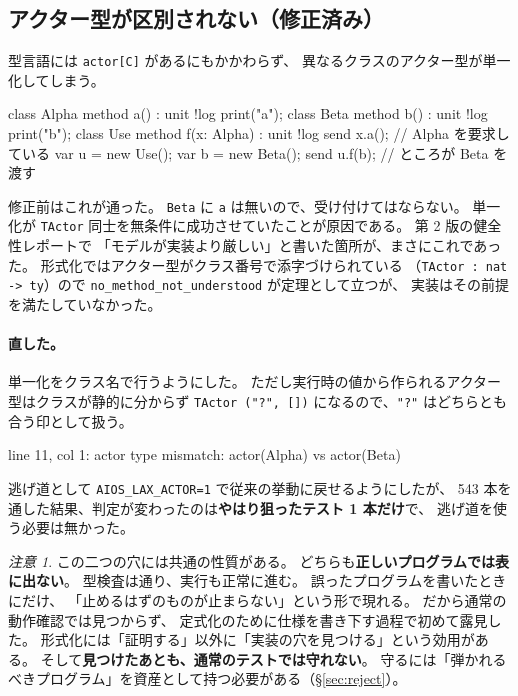 \documentclass[11pt,a4paper]{ltjsarticle}
\theoremstyle{definition}
\theoremstyle{remark}
\newtheorem{remark}[theorem]{注意}
\begin{document}
\subsection{アクター型が区別されない（修正済み）}

型言語には \texttt{actor[C]} があるにもかかわらず、
異なるクラスのアクター型が単一化してしまう。

\begin{aipl}
class Alpha { method a() : unit !{log} { print("a"); } }
class Beta  { method b() : unit !{log} { print("b"); } }
class Use {
  method f(x: Alpha) : unit !{log} { send x.a(); }   // Alpha を要求している
}
var u = new Use();
var b = new Beta();
send u.f(b);          // ところが Beta を渡す
\end{aipl}

修正前はこれが通った。
\texttt{Beta} に \texttt{a} は無いので、受け付けてはならない。
単一化が \texttt{TActor} 同士を無条件に成功させていたことが原因である。
第 2 版の健全性レポートで
「モデルが実装より厳しい」と書いた箇所が、まさにこれであった。
形式化ではアクター型がクラス番号で添字づけられている
（\texttt{TActor : nat -> ty}）ので
\texttt{no\_method\_not\_understood} が定理として立つが、
実装はその前提を満たしていなかった。

\paragraph{直した。}
単一化をクラス名で行うようにした。
ただし実行時の値から作られるアクター型はクラスが静的に分からず
\texttt{TActor ("?", [])} になるので、\texttt{"?"} はどちらとも合う印として扱う。

\begin{term}
 line 11, col 1: actor type mismatch: actor(Alpha) vs actor(Beta)
\end{term}

逃げ道として \texttt{AIOS\_LAX\_ACTOR=1} で従来の挙動に戻せるようにしたが、
543 本を通した結果、判定が変わったのは\textbf{やはり狙ったテスト 1 本だけ}で、
逃げ道を使う必要は無かった。

\begin{remark}
この二つの穴には共通の性質がある。
どちらも\textbf{正しいプログラムでは表に出ない}。
型検査は通り、実行も正常に進む。
誤ったプログラムを書いたときにだけ、
「止めるはずのものが止まらない」という形で現れる。
だから通常の動作確認では見つからず、
定式化のために仕様を書き下す過程で初めて露見した。
形式化には「証明する」以外に「実装の穴を見つける」という効用がある。
そして\textbf{見つけたあとも、通常のテストでは守れない}。
守るには「弾かれるべきプログラム」を資産として持つ必要がある（\S\ref{sec:reject}）。
\end{remark}
\end{document}
